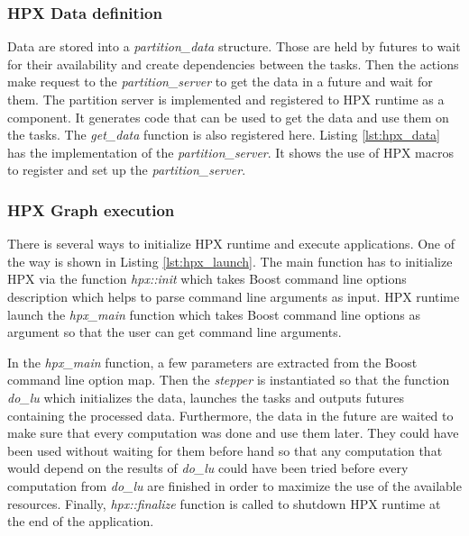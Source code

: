 \subsubsection{HPX Data definition}
Data are stored into a \textit{partition\_data} structure.
Those are held by futures to wait for their availability and create dependencies between the tasks.
Then the actions make request to the \textit{partition\_server} to get the data in a future and wait for them.
The partition server is implemented and registered to HPX runtime as a component.
It generates code that can be used to get the data and use them on the tasks.
The \textit{get\_data} function is also registered here.
Listing \ref{lst:hpx_data} has the implementation of the \textit{partition\_server}.
It shows the use of HPX macros to register and set up the \textit{partition\_server}.




\subsubsection{HPX Graph execution}
There is several ways to initialize HPX runtime and execute applications.
One of the way is shown in Listing \ref{lst:hpx_launch}.
The main function has to initialize HPX via the function \textit{hpx::init} which takes Boost command line options description which helps to parse command line arguments as input.
HPX runtime launch the \textit{hpx\_main} function which takes Boost command line options as argument so that the user can get command line arguments.

In the \textit{hpx\_main} function, a few parameters are extracted from the Boost command line option map.
Then the \textit{stepper} is instantiated so that the function \textit{do\_lu} which initializes the data, launches the tasks and outputs futures containing the processed data.
Furthermore, the data in the future are waited to make sure that every computation was done and use them later.
They could have been used without waiting for them before hand so that any computation that would depend on the results of \textit{do\_lu} could have been tried before every computation from \textit{do\_lu} are finished in order to maximize the use of the available resources.
Finally, \textit{hpx::finalize} function is called to shutdown HPX runtime at the end of the application.




